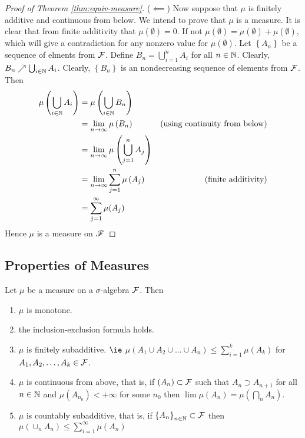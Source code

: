 \begin{proof}[Proof of Theorem \ref{thm:equiv-measure}]
    ($\impliedby$) Now suppose that $\mu$ is finitely additive and continuous from below.
    We intend to prove that $\mu$ is a measure. It is clear that from finite additivity that $\mu \left( \emptyset \right) = 0$. If not $\mu \left( \emptyset \right) = \mu \left( \emptyset \right) + \mu\left( \emptyset \right)$, which will give a contradiction for any nonzero value for $\mu \left( \emptyset \right)$. Let $\left\{ A_n \right\}$ be a sequence of elments from ${\cal F}$. Define $B_n = \bigcup_{i=1}^{n} A_i$ for all $n\in \mathbb N$. Clearly, $B_n \nearrow \bigcup_{i \in \mathbb N} A_i$. Clearly, $\left\{ B_n \right\}$ is an nondecreasing sequence of elements from ${\cal F}$. Then
    \begin{align*}
        \mu \left( \bigcup_{i \in \mathbb N} A_i \right) &= \mu \left( \bigcup_{i \in \mathbb N} B_n \right) &\\
        &= \lim_{n \to \infty} \mu\left( B_n \right) & \text{(using continuity from below)} \\
        &= \lim_{n \to \infty} \mu \left( \bigcup_{j=1}^{n} A_j \right) & \\
        &= \lim_{n \to \infty} \sum_{j=1}^{n} \mu \left( A_j \right) & \text{(finite additivity)} \\
        &= \sum_{j=1}^{\infty} \mu (A_j) 
    \end{align*}
    Hence $\mu$ is a measure on ${\mathscr F}$
\end{proof}



\subsection{Properties of Measures}

\begin{theorem}
    \label{thm:prop-measures}
    Let $\mu$ be a measure on a $\sigma$-algebra ${\cal F}$. Then
    \begin{enumerate}[label=(\arabic*)]
	    \item $\mu$ is monotone.
	    \item the inclusion-exclusion formula holds.
	    \item $\mu$ is finitely subadditive. $\ie$ $\mu \left( A_1 \cup A_2 \cup \ldots \cup A_n \right) \le \sum_{i=1}^{k} \mu (A_k)$ for $A_1, A_2, \ldots , A_k \in {\cal F}	$.
	    \item $\mu$ is continuous from above, that is, if $\left( A_n \right) \subset {\cal F}$ such that $A_n \supset A_{n+1}$ for all $n\in\mathbb N$ and $\mu (A_{n_0}) < +\infty$ for some $n_0$ then $\lim \mu(A_n) = \mu \left( \bigcap_n A_n \right)$.
	    \item $\mu$ is countably subadditive, that is, if $\left\{ A_n \right\}_{n\in \mathbb N}\subset {\cal F}$ then $\mu \left(\cup_n A_n \right) \le \sum_{i=1}^{\infty} \mu \left( A_n \right)$
    \end{enumerate}
\end{theorem}

